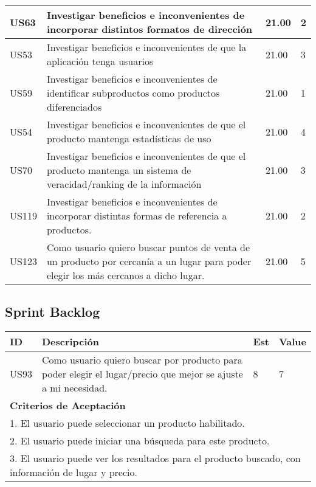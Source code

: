 \documentclass[a4paper,8pt]{article}
\begin{document}
\begin{tabular}{|p{1cm}|p{10cm}|p{1cm}|p{1cm}|}
\hline
US63 &Investigar beneficios e inconvenientes de incorporar distintos formatos de dirección &21.00&2\\ 
\hline
US53 &Investigar beneficios e inconvenientes de que la aplicación tenga usuarios& 21.00&3\\ 
\hline	
US59 &Investigar beneficios e inconvenientes de identificar subproductos como productos diferenciados &21.00&1\\ 
\hline		
US54 &Investigar beneficios e inconvenientes de que el producto mantenga estadísticas de uso &21.00&4\\ 
\hline	
US70 &Investigar beneficios e inconvenientes de que el producto mantenga un sistema de veracidad/ranking de la información &21.00&3\\ 	
\hline	
US119 &Investigar beneficios e inconvenientes de incorporar distintas formas de referencia a productos. &21.00&2\\ 
\hline		
US123 &Como usuario quiero buscar puntos de venta de un producto por cercanía a un lugar para poder elegir los más cercanos a dicho lugar. &21.00&5\\ 
\hline
\hline
\end{tabular}
\newpage

\subsection{Sprint Backlog}

\bigskip
\center
\begin{tabular}{|p{1cm}|p{10cm}|p{1cm}|p{1cm}|}
\hline
\hline
\textbf{ID}&\textbf{Descripción}&\textbf{Est}&\textbf{Value}\\
\hline
\hline
US93&Como usuario quiero buscar por producto para poder elegir el lugar/precio que mejor se ajuste a mi necesidad.& 8& 7\\
\hline
\hline
\multicolumn{4}{|p{13cm}|}{ \textbf{Criterios de Aceptación}} \\
\hline
\hline
\multicolumn{4}{|p{13cm}|}{1. El usuario puede seleccionar un producto habilitado.}\\
\multicolumn{4}{|p{13cm}|}{2. El usuario puede iniciar una búsqueda para este producto.}\\
\multicolumn{4}{|p{13cm}|}{3. El usuario puede ver los resultados para el producto buscado, con información de lugar y precio.}\\
\hline
\hline
\end{tabular}
\end{document}
